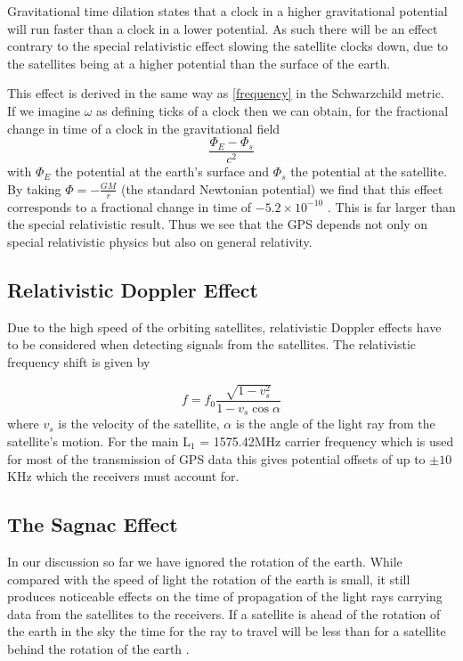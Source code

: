 Gravitational time dilation states that a clock in a higher gravitational potential will run faster than a clock in a lower potential. 
As such there will be an effect contrary to the special relativistic effect slowing the satellite clocks down, due to the satellites being at a higher potential than the surface of the earth. 

This effect is derived in the same way as \eqref{frequency} in the Schwarzchild metric. If we imagine \(\omega\) as defining ticks of a clock then we can obtain, for the fractional change in time of a clock in the gravitational field  
\begin{equation} \label{time-gravitational} 
	\frac{\Phi_{E} - \Phi_{s}}{c^2}
\end{equation}
with \(\Phi_{E}\) the potential at the earth's surface and \(\Phi_{s}\) the potential at the satellite. 
By taking $\Phi = - \frac{GM}{r}$ (the standard Newtonian potential) we find that this effect corresponds to a fractional change in time of $-5.2 \times 10^{-10}$ \cite{hartle}. 
This is far larger than the special relativistic result. Thus we see that the GPS depends not only on special relativistic physics but also on general relativity.  

\subsection{Relativistic Doppler Effect}

Due to the high speed of the orbiting satellites, relativistic Doppler effects have to be considered when detecting signals from the satellites. The relativistic frequency shift is given by \cite{hartle}

\begin{equation} \label{doppler}
	f = f_0 \frac{\sqrt{1-v_s^2}}{1 - v_s \cos \alpha}
\end{equation} 
where $v_s$ is the velocity of the satellite, $\alpha$ is the angle of the light ray from the satellite's motion. For the main L$_1$ = 1575.42MHz carrier frequency which is used for most of the transmission of GPS data this gives potential offsets of up to $\pm 10$KHz which the receivers must account for.

\subsection{The Sagnac Effect}

In our discussion so far we have ignored the rotation of the earth. While compared with the speed of light the rotation of the earth is small, it still produces noticeable effects on the time of propagation of the light rays carrying data from the satellites to the receivers. If a satellite is ahead of the rotation of the earth in the sky the time for the ray to travel will be less than for a satellite behind the rotation of the earth \cite{ashby, ashby-llr}.


